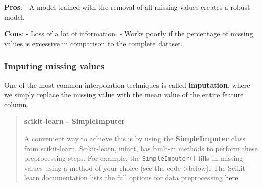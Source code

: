 \documentclass{article}
\begin{document}
    \textbf{Pros}: - A model trained with the removal of all missing values
creates a robust model.

\textbf{Cons}: - Loss of a lot of information. - Works poorly if the
percentage of missing values is excessive in comparison to the complete
dataset.

    \subsubsection{Imputing missing values}\label{imputing-missing-values}

One of the most common interpolation techniques is called
\textbf{imputation}, where we simply replace the missing value with the
mean value of the entire feature column.

    \begin{quote}
\textbf{scikit-learn - SimpleImputer}

A convenient way to achieve this is by using the \textbf{SimpleImputer}
class from scikit-learn. Scikit-learn, infact, has built-in methods to
perform these preprocessing steps. For example, the
\texttt{SimpleImputer()} fills in missing values using a method of your
choice (see the code \textgreater below). The Scikit-learn documentation
lists the full options for data preprocessing
\href{https://scikit-learn.org/stable/modules/preprocessing.html}{here}.
\end{quote}
\end{document}
